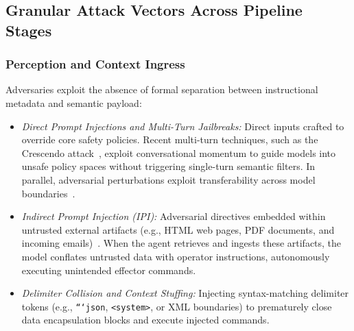 \subsection{Granular Attack Vectors Across Pipeline Stages}
\label{subsec:pipeline_vectors}

\subsubsection{Perception and Context Ingress}
Adversaries exploit the absence of formal separation between instructional metadata and semantic payload:
\begin{itemize}
    \item \textit{Direct Prompt Injections and Multi-Turn Jailbreaks:} Direct inputs crafted to override core safety policies. Recent multi-turn techniques, such as the Crescendo attack~\cite{russinovich2025great}, exploit conversational momentum to guide models into unsafe policy spaces without triggering single-turn semantic filters. In parallel, adversarial perturbations exploit transferability across model boundaries~\cite{liang2026perspectiveinvariant, ke2024frequencyselective, wang2024progen}.
    \item \textit{Indirect Prompt Injection (IPI):} Adversarial directives embedded within untrusted external artifacts (e.g., HTML web pages, PDF documents, and incoming emails)~\cite{greshake2023not, sutton2024indirect}. When the agent retrieves and ingests these artifacts, the model conflates untrusted data with operator instructions, autonomously executing unintended effector commands.
    \item \textit{Delimiter Collision and Context Stuffing:} Injecting syntax-matching delimiter tokens (e.g., \texttt{```json}, \texttt{<system>}, or XML boundaries) to prematurely close data encapsulation blocks and execute injected commands.
\end{itemize}

